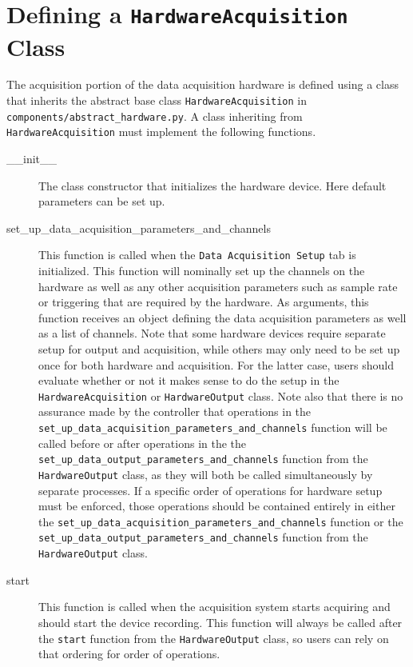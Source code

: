 \documentclass[pdf,12pt,report]{SANDreport}
\newcommand{\inlineCode}{\lstinline[basicstyle=\bfseries\ttfamily]}
\begin{document}
    \section{Defining a \inlineCode{HardwareAcquisition} Class}
    The acquisition portion of the data acquisition hardware is defined using a class that inherits the abstract base class \inlineCode{HardwareAcquisition} in \inlineCode{components/abstract_hardware.py}.  A class inheriting from \inlineCode{HardwareAcquisition} must implement the following functions.
    \begin{description}
        \item[\_\_init\_\_] The class constructor that initializes the hardware device.  Here default parameters can be set up.
        \item[set\_up\_data\_acquisition\_parameters\_and\_channels] This function is called when the \inlineCode{Data Acquisition Setup} tab is initialized.  This function will nominally set up the channels on the hardware as well as any other acquisition parameters such as sample rate or triggering that are required by the hardware.  As arguments, this function receives an object defining the data acquisition parameters as well as a list of channels.  Note that some hardware devices require separate setup for output and acquisition, while others may only need to be set up once for both hardware and acquisition.  For the latter case, users should evaluate whether or not it makes sense to do the setup in the \inlineCode{HardwareAcquisition} or \inlineCode{HardwareOutput} class.  Note also that there is no assurance made by the controller that operations in the \inlineCode{set_up_data_acquisition_parameters_and_channels} function will be called before or after operations in the the \inlineCode{set_up_data_output_parameters_and_channels} function from the \inlineCode{HardwareOutput} class, as they will both be called simultaneously by separate processes.  If a specific order of operations for hardware setup must be enforced, those operations should be contained entirely in either the \inlineCode{set_up_data_acquisition_parameters_and_channels} function or the \inlineCode{set_up_data_output_parameters_and_channels} function from the \inlineCode{HardwareOutput} class.
        \item[start] This function is called when the acquisition system starts acquiring and should start the device recording.  This function will always be called after the \inlineCode{start} function from the \inlineCode{HardwareOutput} class, so users can rely on that ordering for order of operations.

\end{description}
\end{document}
